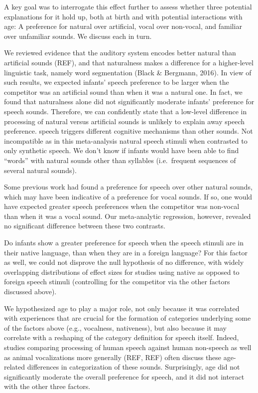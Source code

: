 \documentclass[]{apa6}
\begin{document}
A key goal was to interrogate this effect further to assess whether
three potential explanations for it hold up, both at birth and with
potential interactions with age: A preference for natural over
artificial, vocal over non-vocal, and familiar over unfamiliar sounds.
We discuss each in turn.

We reviewed evidence that the auditory system encodes better natural
than artificial sounds (REF), and that naturalness makes a difference
for a higher-level linguistic task, namely word segmentation (Black \&
Bergmann, 2016). In view of such results, we expected infants' speech
preference to be larger when the competitor was an artificial sound than
when it was a natural one. In fact, we found that naturalness alone did
not significantly moderate infants' preference for speech sounds.
Therefore, we can confidently state that a low-level difference in
processing of natural versus artificial sounds is unlikely to explain
away speech preference. speech triggers different cognitive mechanisms
than other sounds. Not incompatible as in this meta-analysis natural
speech stimuli when contrasted to only synthetic speech. We don't know
if infants would have been able to find \enquote{words} with natural
sounds other than syllables (i.e.~frequent sequences of several natural
sounds).

Some previous work had found a preference for speech over other natural
sounds, which may have been indicative of a preference for vocal sounds.
If so, one would have expected greater speech preferences when the
competitor was non-vocal than when it was a vocal sound. Our
meta-analytic regression, however, revealed no significant difference
between these two contrasts.

Do infants show a greater preference for speech when the speech stimuli
are in their native language, than when they are in a foreign language?
For this factor as well, we could not disprove the null hypothesis of no
difference, with widely overlapping distributions of effect sizes for
studies using native as opposed to foreign speech stimuli (controlling
for the competitor via the other factors discussed above).

We hypothesized age to play a major role, not only because it was
correlated with experiences that are crucial for the formation of
categories underlying some of the factors above (e.g., vocalness,
nativeness), but also because it may correlate with a reshaping of the
category definition for speech itself. Indeed, studies comparing
processing of human speech against human non-speech as well as animal
vocalizations more generally (REF, REF) often discuss these age-related
differences in categorization of these sounds. Surprisingly, age did not
significantly moderate the overall preference for speech, and it did not
interact with the other three factors.
\end{document}

